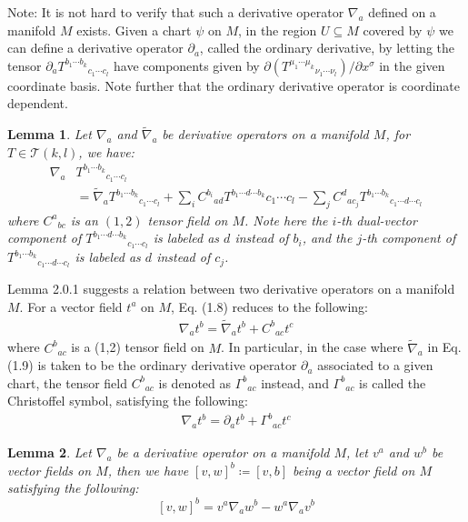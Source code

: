 \documentclass[11pt, onesided]{book}
\theoremstyle{break}
\theoremstyle{break}
\newtheorem{lem}{Lemma}[thm]
\newcommand{\pd}{\partial}
\newcommand{\that}[1]{\widetilde{#1}}
\newcommand{\note}{\color{red}Note: \color{black}}
\begin{document}
\note It is not hard to verify that such a derivative operator $\nabla_a$ defined on a manifold $M$ exists. Given a chart $\psi$ on $M$, in the region $U \subseteq M$ covered by $\psi$ we can define a derivative operator $\pd_a$, called the ordinary derivative, by letting the tensor $\pd_a T^{b_1 \cdots b_k}{}_{c_1 \cdots  c_l} $ have components given by $\pd(T^{\mu_1 \cdots \mu_k}{}_{\nu_1 \cdots  \nu_l})/\pd x^\sigma$ in the given coordinate basis. Note further that the ordinary derivative operator is coordinate dependent. 

\begin{lem}
Let $\nabla_a$ and $\that{\nabla}_a$ be derivative operators on a manifold $M$, for $T \in \mathcal{T}(k,l)$, we have:
\begin{align*}
\nabla_a &T^{b_1 \cdots  b_k}{}_{c_1 \cdots c_l} \\
&= \that{\nabla}_a T^{b_1 \cdots  b_k}{}_{c_1 \cdots c_l} +\sum_i C^{b_i}{}_{ad}T^{b_1 \cdots  d \cdots  b_k}_{}{c_1 \cdots  c_l}-\sum_j  C^{d}{}_{ac_j}T^{b_1 \cdots   b_k}{}_{c_1 \cdots  d \cdots  c_l} \tag{1.8}
\end{align*}
where $C^{a}{}_{bc}$ is an $(1,2)$ tensor field on $M$. Note here the $i$-th dual-vector component of $T^{b_1 \cdots  d \cdots  b_k}{}_{c_1 \cdots  c_l}$ is labeled as $d$ instead of $b_i$, and the $j$-th component of $T^{b_1 \cdots   b_k}{}_{c_1 \cdots  d \cdots  c_l}$ is labeled as $d$ instead of $c_j$. 
\end{lem} 

Lemma 2.0.1 suggests a relation between two derivative operators on a manifold $M$. For a vector field $t^a$ on $M$, Eq. (1.8) reduces to the following:
\setcounter{equation}{8}
\begin{align}
\nabla_at^b = \that{\nabla}_at^b +C^b{}_{ac} t^c
\end{align}
where $C^b{}_{ac}$ is a (1,2) tensor field on $M$. In particular, in the case where $\that{\nabla}_a$ in Eq. (1.9) is taken to be the ordinary derivative operator $\pd_a$ associated to a given chart, the tensor field $C^{b}{}_{ac}$ is denoted as $\Gamma^b{}_{ac}$ instead, and $\Gamma^b{}_{ac}$ is called the Christoffel symbol, satisfying the following:
\begin{align}
\nabla_at^b = \pd_at^b +\Gamma^b{}_{ac} t^c
\end{align}

\begin{lem}
Let $\nabla_a$ be a derivative operator on a manifold $M$, let $v^a$ and $w^b$ be vector fields on $M$, then we have $[v,w]^b\coloneqq [v,b]$ being a vector field on $M$ satisfying the following:
$$[v,w]^b = v^a \nabla_a w^b - w^a \nabla_a v^b$$
\end{lem}
\end{document}
